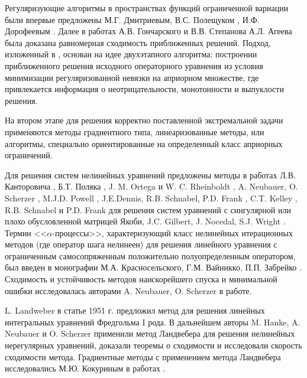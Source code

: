 {Регуляризующие алгоритмы в пространствах функций ограниченной вариации были впервые предложены М.Г. Дмитриевым, В.С. Полещуком \cite{DmiPol1972}, И.Ф. Дорофеевым \cite{Dor1979}. Далее в работах А.В. Гончарского и В.В. Степанова \cite{GonSte1979} А.Л. Агеева \cite{Ag1980} была доказана равномерная сходимость приближенных решений. Подход, изложенный в \cite{TikhGonSteYag1990}, основан на идее двухэтапного алгоритма: построении приближенного решения  исходного операторного уравнения из условия минимизации регуляризованной невязки на априорном множестве, где привлекается информация о неотрицательности, монотонности и выпуклости решения. %

На втором этапе для решения корректно поставленной экстремальной задачи применяются методы градиентного типа, линеаризованные методы, или алгоритмы, специально ориентированные на определенный класс априорных ограничений.

Для решения систем нелинейных уравнений предложены методы в работах Л.В. Канторовича \cite{Kan1947}, Б.Т. Поляка \cite{Pol1969}, J. M. Ortega и W. C. Rheinboldt \cite{OrtRhe1970}, A. Neubauer, O. Scherzer \cite{NeuSch1995_1, Sch1995}, M.J.D. Powell \cite{Pow1970}, J.E.Dennis, R.B. Schnabel, P.D. Frank \cite{DenSchn1996}, C.T. Kelley \cite{Kel1995}, R.B. Schnabel и P.D. Frank \cite{SchnFra1983} для решения систем уравнений с сингулярной или плохо обусловленной матрицей Якоби, J.C. Gilbert, J. Nocedal, S.J. Wright \cite{GilNoc1991, NocWri2006}. Термин <<$\alpha$-процессы>>, характеризующий класс нелинейных итерационных методов (где оператор шага нелинеен) для решения линейного уравнения с ограниченным самосопряженным положительно полуопределенным оператором, был введен в монографии М.А. Красносельского, Г.М. Вайникко, П.П. Забрейко \cite{KraVayZab1969}. Сходимость и устойчивость методов наискорейшего спуска и минимальной ошибки исследовалась авторами A. Neubauer, O. Scherzer в работе\cite{NeuSch1995_2}.

L. Landweber в статье \cite{Lan1951} 1951 г. предложил метод для решения линейных интегральных уравнений Фредгольма I рода. В дальнейшем авторы M. Hanke, A. Neubauer и O. Scherzer \cite{HanNeuSch1995,Neu2000,NeuSch1995_2} применили метод Ландвебера для решения нелинейных нерегулярных уравнений, доказали теоремы о сходимости и исследовали скорость сходимости метода. Градиентные методы с применением метода Ландвебера исследовались М.Ю. Кокуриным в работах \cite{Kok2010_1,Kok2010_2}.

}
